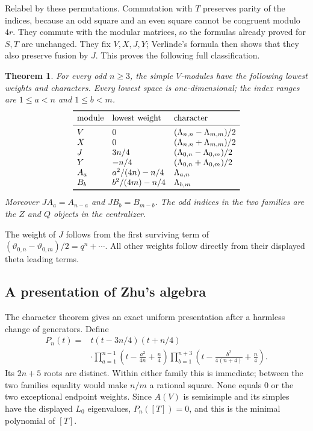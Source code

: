\documentclass[11pt]{article}
\newtheorem{theorem}{Theorem}[section]
\numberwithin{equation}{section}
\begin{document}
Relabel by these permutations. Commutation with $T$ preserves parity of the indices, because an odd square and an even square cannot be congruent modulo $4r$. They commute with the modular matrices, so the formulas already proved for $S,T$ are unchanged. They fix $V,X,J,Y$; Verlinde's formula then shows that they also preserve fusion by $J$. This proves the following full classification.

\begin{theorem}\label{B:characterthm}
For every odd $n\geq3$, the simple $V$-modules have the following lowest weights and characters. Every lowest space is one-dimensional; the index ranges are $1\leq a<n$ and $1\leq b<m$.
\[
\begin{array}{lll}\toprule
\text{module}&\text{lowest weight}&\text{character}\\\midrule
V&0&(\Lambda_{n,n}-\Lambda_{m,m})/2\\
X&0&(\Lambda_{n,n}+\Lambda_{m,m})/2\\
J&3n/4&(\Lambda_{0,n}-\Lambda_{0,m})/2\\
Y&-n/4&(\Lambda_{0,n}+\Lambda_{0,m})/2\\
A_a&a^2/(4n)-n/4&\Lambda_{a,n}\\
B_b&b^2/(4m)-n/4&\Lambda_{b,m}\\\bottomrule
\end{array}
\]
Moreover $JA_a=A_{n-a}$ and $JB_b=B_{m-b}$. The odd indices in the two families are the $Z$ and $Q$ objects in the centralizer. 
\end{theorem}
The weight of $J$ follows from the first surviving term of
$(\vartheta_{0,n}-\vartheta_{0,m})/2=q^n+\cdots$. All other weights follow directly from their displayed theta leading terms. 

\subsection{A presentation of Zhu's algebra}
The character theorem gives an exact uniform presentation after a harmless change of generators. Define
\begin{equation}\label{B:ZhuP}
\begin{split}
 P_n(t)={}&t(t-3n/4)(t+n/4)\\
 &\cdot\prod_{a=1}^{n-1}\left(t-\frac{a^2}{4n}+\frac n4\right)
 \prod_{b=1}^{n+3}\left(t-\frac{b^2}{4(n+4)}+\frac n4\right).
\end{split}
\end{equation}
Its $2n+5$ roots are distinct. Within either family this is immediate; between the two families equality would make $n/m$ a rational square. None equals $0$ or the two exceptional endpoint weights. Since $A(V)$ is semisimple and its simples have the displayed $L_0$ eigenvalues,
$P_n([T])=0$, and this is the minimal polynomial of $[T]$.
\end{document}
